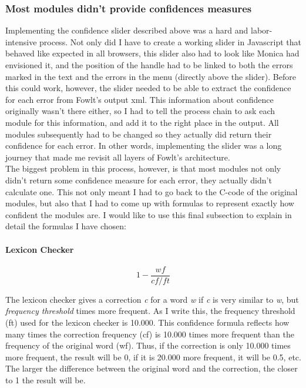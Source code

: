 \documentclass[12pt]{article}
\begin{document}
\subsubsection{Most modules didn't provide confidences measures} \label{formulas}
Implementing the confidence slider described above was a hard and labor-intensive process. Not only did I have to create a working slider in Javascript that behaved like expected in all browsers, this slider also had to look like Monica had envisioned it, and the position of the handle had to be linked to both the errors marked in the text and the errors in the menu (directly above the slider). Before this could work, however, the slider needed to be able to extract the confidence for each error from Fowlt's output xml. This information about confidence originally wasn't there either, so I had to tell the process chain to ask each module for this information, and add it to the right place in the output. All modules subsequently had to be changed so they actually did return their confidence for each error. In other words, implementing the slider was a long journey that made me revisit all layers of Fowlt's architecture.\\\indent
The biggest problem in this process, however, is that most modules not only didn't return some confidence measure for each error, they actually didn't calculate one. This not only meant I had to go back to the C-code of the original modules, but also that I had to come up with formulas to represent exactly how confident the modules are. I would like to use this final subsection to explain in detail the formulas I have chosen:

\paragraph{Lexicon Checker}

\[
1 - \frac{wf}{cf/ft}
\]

The lexicon checker gives a correction \emph{c} for a word \emph{w} if \emph{c} is very similar to \emph{w}, but \emph{frequency threshold} times more frequent. As I write this, the frequency threshold (ft) used for the lexicon checker is 10.000. This confidence formula reflects how many times the correction frequency (cf) is 10.000 times more frequent than the frequency of the original word (wf). Thus, if the correction is only 10.000 times more frequent, the result will be 0, if it is 20.000 more frequent, it will be 0.5, etc. The larger the difference between the original word and the correction, the closer to 1 the result will be.
\end{document}
